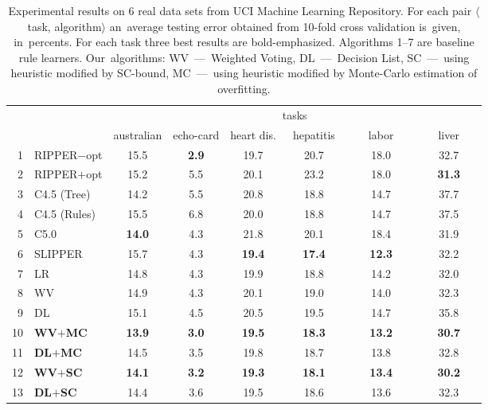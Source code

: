 \documentclass{article}
\begin{document}
\begin{table}[t]
    \def\r#1{\textbf{#1}}
    \caption{Experimental results on 6 real data sets from UCI Machine Learning Repository.
        For each pair $\langle$task, algorithm$\rangle$
        an~average testing error obtained from 10-fold cross validation is~given, in~percents.
        For each task three best results are bold-emphasized.
        Algorithms 1--7 are baseline rule learners.
        Our~algorithms:
        WV~---~Weighted Voting,\;
        DL~---~Decision List,\;
        SC~---~using heuristic modified by SC-bound,\;
        MC~---~using heuristic modified by Monte-Carlo estimation of overfitting.
    }
    \label{tab:Experiment}
    \medskip\centering
    \begin{tabular}{|r|l||c|c|c|c|c|c|}
        \hline
        && \multicolumn{6}{c|}{tasks} \\
        \cline{3-8}
        & \raisebox{1.2ex}{algorithms}
                & australian  & echo-card  & heart dis.   & ~hepatitis~   & ~~~labor~~~   & ~~~liver~~~  \\
        \hline
        1& RIPPER$-$opt &15.5&\r{2.9}&19.7&20.7&18.0&32.7\\
        \hline
        2& RIPPER$+$opt &15.2&5.5&20.1&23.2&18.0&\r{31.3}\\
        \hline
        3& C4.5 (Tree) &14.2&5.5&20.8&18.8&14.7&37.7\\
        \hline
        4& C4.5 (Rules)&15.5&6.8&20.0&18.8&14.7&37.5\\
        \hline
        5& C5.0       &\r{14.0}&4.3&21.8&20.1&18.4&31.9\\
        \hline
        6& SLIPPER    &15.7&4.3&\r{19.4}&\r{17.4}&\r{12.3}&32.2\\
        \hline
        7& LR         &14.8&4.3&19.9&18.8&14.2&32.0\\
        \hline
        \hline
        8& WV         &14.9&4.3&20.1&19.0&14.0&32.3\\
        \hline
        9& DL         &15.1&4.5&20.5&19.5&14.7&35.8\\
        \hline
        \hline
        10& \r{WV$+$MC}      &\r{13.9}&\r{3.0}&\r{19.5}&\r{18.3}&\r{13.2}&\r{30.7}\\
        \hline
        11& \r{DL$+$MC}      &14.5&3.5&19.8&18.7&13.8&32.8\\
        \hline
        \hline
        12& \r{WV$+$SC}     &\r{14.1}&\r{3.2}&\r{19.3}&\r{18.1}&\r{13.4}&\r{30.2}\\
        \hline
        13& \r{DL$+$SC}     &14.4&3.6&19.5&18.6&13.6&32.3\\
        \hline
    \end{tabular}
\end{table}
\end{document}
